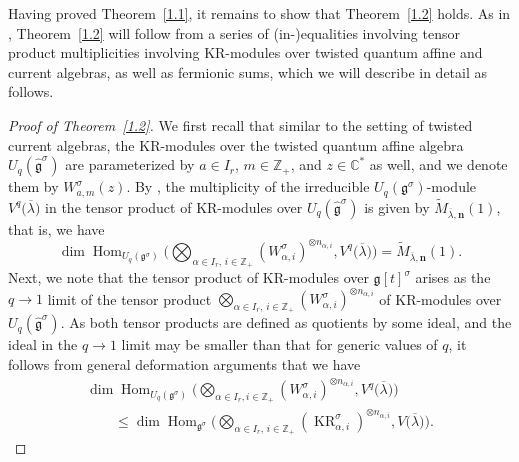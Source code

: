 \documentclass[pdftex]{sigma}
\numberwithin{equation}{section}
\DeclareMathOperator{\KR}{KR}
\DeclareMathOperator{\Hom}{Hom}
\begin{document}
Having proved Theorem~\ref{1.1}, it remains to show that Theorem~\ref{1.2} holds. As in \cite[Section~1]{Kedem11}, Theorem~\ref{1.2} will follow from a series of (in-)equalities involving tensor product multiplicities involving KR-modules over twisted quantum affine and current algebras, as well as fermionic sums, which we will describe in detail as follows.

\begin{proof}[Proof of Theorem~\ref{1.2}]
We first recall that similar to the setting of twisted current algebras, the KR-modules over the twisted quantum affine algebra $U_q(\widehat{\mathfrak{g}}^{\sigma})$ are parameterized by $a\in I_r$, $m\in\mathbb{Z}_+$, and $z\in\mathbb{C}^*$ as well, and we denote them by $W_{a,m}^{\sigma}(z)$. By \cite[Theorem 8.5]{Hernandez10}, the multiplicity of the irreducible $U_q(\mathfrak{g}^{ \sigma})$-module $V^q\bigl(\overline{\lambda}\bigr)$ in the tensor product  of KR-modules over $U_q(\widehat{\mathfrak{g}}^{\sigma})$ is given by $\tilde{M}_{\overline{\lambda},\mathbf{n}}(1)$, that is, we have
\begin{equation}
\dim\Hom_{U_q(\mathfrak{g}^{\sigma})}\biggl(\bigotimes_{ \alpha\in I_r,\,i\in\mathbb{Z}_+}(W_{\alpha,i}^{\sigma})^{ \otimes n_{\alpha,i}} ,V^q\bigl(\overline{\lambda}\bigr)\biggr)
=\tilde{M}_{\overline{\lambda},\mathbf{n}}(1).\label{eq:4.26}
\end{equation}
Next, we note that the tensor product \smash{$\bigotimes_{\alpha\in I_r,\,i\in\mathbb{Z}_+} (\KR_{\alpha,i}^{\sigma})^{\otimes n_{\alpha,i}}$} of KR-modules over $\mathfrak{g}[t]^{\sigma}$ arises as the $q\to 1$ limit of the tensor product $\bigotimes_{\alpha\in I_r,\, i\in\mathbb{Z}_+} (W_{\alpha,i}^{\sigma})^{\otimes n_{\alpha,i}}$ of KR-modules over $U_q(\widehat{\mathfrak{g}}^{\sigma})$. As both tensor products are defined as quotients by some ideal, and the ideal in the $q\to 1$ limit may be smaller than that for generic values of $q$, it follows from general deformation arguments that we have
\begin{gather}
\dim\Hom_{U_q(\mathfrak{g}^{\sigma})}\biggl(\bigotimes_{ \alpha\in I_r,i\in\mathbb{Z}_+}(W_{\alpha,i}^{\sigma})^{ \otimes n_{\alpha,i}} ,V^q\bigl(\overline{\lambda}\bigr)\biggr)\nonumber\\
\qquad
\leq\dim\Hom_{\mathfrak{g}^{\sigma}}\biggl(\bigotimes_{ \alpha\in I_r,
\, i\in\mathbb{Z}_+}(\KR_{\alpha,i}^{\sigma})^{ \otimes n_{\alpha,i}},V\bigl(\overline{\lambda}\bigr)\biggr).\label{eq:4.27}

\end{gather}
\end{proof}
\end{document}

